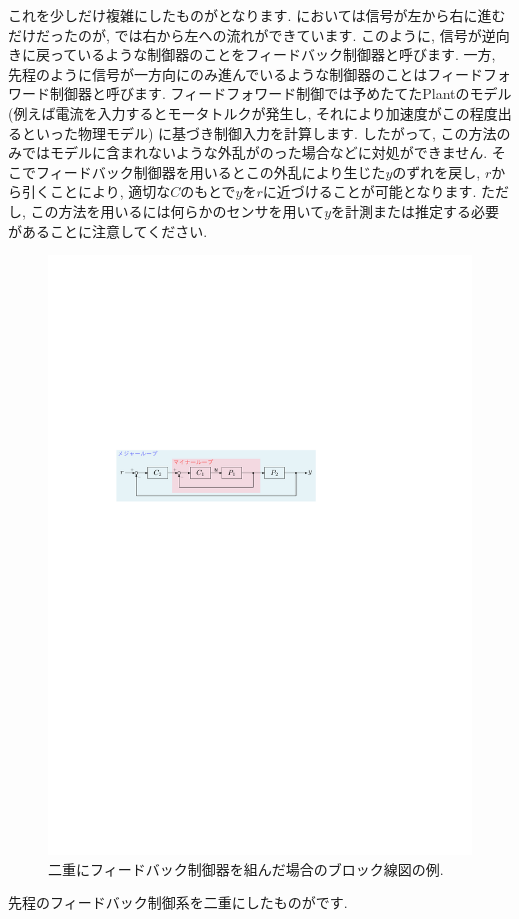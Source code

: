 これを少しだけ複雑にしたものがとなります. 
においては信号が左から右に進むだけだったのが, では右から左への流れができています. 
このように, 信号が逆向きに戻っているような制御器のことをフィードバック制御器と呼びます. 
一方, 先程のように信号が一方向にのみ進んでいるような制御器のことはフィードフォワード制御器と呼びます. 
フィードフォワード制御では予めたてたPlantのモデル (例えば電流を入力するとモータトルクが発生し, それにより加速度がこの程度出るといった物理モデル) に基づき制御入力を計算します. 
したがって, この方法のみではモデルに含まれないような外乱がのった場合などに対処ができません. 
そこでフィードバック制御器を用いるとこの外乱により生じた$y$のずれを戻し, $r$から引くことにより, 適切な$C$のもとで$y$を$r$に近づけることが可能となります. 
ただし, この方法を用いるには何らかのセンサを用いて$y$を計測または推定する必要があることに注意してください. 
\par
\begin{figure}[t]
\centering
\includegraphics[width=0.8\hsize]{control/fig/block3.pdf}
\caption{二重にフィードバック制御器を組んだ場合のブロック線図の例. }
\label{fig:block3}
\end{figure}
先程のフィードバック制御系を二重にしたものがです. 
